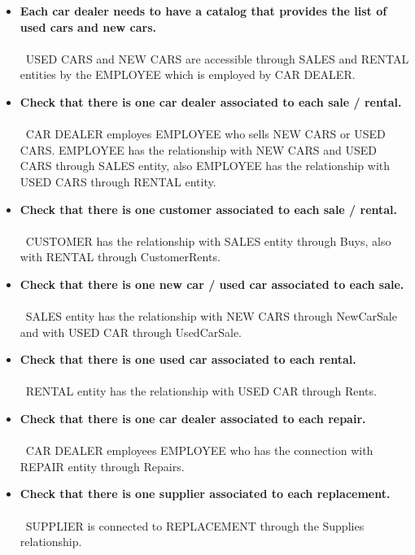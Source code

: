 \begin{itemize}
    \item \textbf{Each car dealer needs to have a catalog that provides the list of used cars and new cars. }\\\\
    \,
    USED CARS and NEW CARS are accessible through SALES and RENTAL entities by the EMPLOYEE which is employed by CAR DEALER.
    \item \textbf{Check that there is one car dealer associated to each sale / rental. }\\\\
    \,
    CAR DEALER employes EMPLOYEE who sells NEW CARS or USED CARS. EMPLOYEE has the relationship with NEW CARS and USED CARS through SALES entity, also EMPLOYEE has the relationship with USED CARS through RENTAL entity.
    \item \textbf{Check that there is one customer associated to each sale / rental. }\\\\
    \,
     CUSTOMER has the relationship with SALES entity through Buys, also with RENTAL through CustomerRents.
    \item \textbf{Check that there is one new car / used car associated to each sale. }\\\\
    \,
    SALES entity has the relationship with NEW CARS through NewCarSale and with USED CAR through UsedCarSale.
    \item \textbf{Check that there is one used car associated to each rental. }\\\\
    \,
    RENTAL entity has the relationship with USED CAR through Rents.
    \item \textbf{Check that there is one car dealer associated to each repair. }\\\\
    \,
    CAR DEALER employees EMPLOYEE who has the connection with REPAIR entity through Repairs. 
    \item \textbf{Check that there is one supplier associated to each replacement.} \\\\
    \,
    SUPPLIER is connected to REPLACEMENT through the Supplies relationship.
\end{itemize}